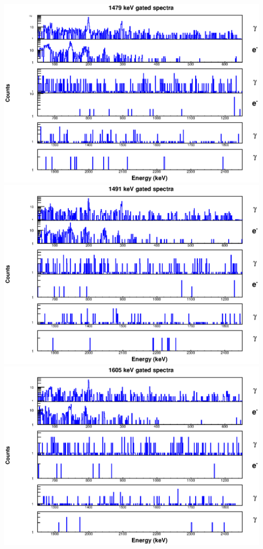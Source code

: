 \begin{landscape}
\includegraphics[scale=1.1]{156Gd_Appendix/1479_combined.eps}
\includegraphics[scale=1.1]{156Gd_Appendix/1491_combined.eps}
\includegraphics[scale=1.1]{156Gd_Appendix/1605_combined.eps}

\end{landscape}
